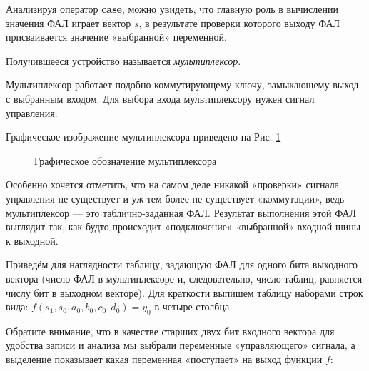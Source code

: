 \documentclass[a5paper, DIV=14, headings=openany, twoside=true,fontsize=10pt, titlepage]{scrreprt}
\newcommand{\quotes}[1]{«#1»}
\newcommand{\eng}[1]{\foreignlanguage{english}{#1}}
\newcommand{\kword}[1]{\eng{\textbf{#1}}}
\begin{document}
\par{Анализируя оператор \kword{case}, можно увидеть, что главную роль в вычислении значения ФАЛ играет вектор $s$, в результате проверки которого выходу ФАЛ присваивается значение \quotes{выбранной} переменной.}

\par{Получившееся устройство называется \emph{мультиплексор}}.

\par{Мультиплексор работает подобно коммутирующему ключу, замыкающему выход с выбранным входом. Для выбора входа мультиплексору нужен сигнал управления. }

\par{Графическое изображение мультиплексора приведено на Рис. \ref{fig:mux}}

\begin{figure}[H]
  \centering
  \def\svgwidth{\columnwidth}
  
  \caption{Графическое обозначение мультиплексора}
  \label{fig:mux}
\end{figure}

\par{Особенно хочется отметить, что на самом деле никакой \quotes{проверки} сигнала управления не существует и уж тем более не существует \quotes{коммутации}, ведь мультиплексор — это таблично-заданная ФАЛ. Результат выполнения этой ФАЛ выглядит так, как будто происходит \quotes{подключение} \quotes{выбранной} входной шины к выходной.}

\par{Приведём для наглядности таблицу, задающую ФАЛ для одного бита выходного вектора (число ФАЛ в мультиплексоре и, следовательно, число таблиц, равняется числу бит в выходном векторе). Для краткости выпишем таблицу наборами строк вида: $f(s_1, s_0, a_0, b_0, c_0, d_0) = y_0$ в четыре столбца.}

\par{Обратите внимание, что в качестве старших двух бит входного вектора для удобства записи и анализа мы выбрали переменные \quotes{управляющего} сигнала, а выделение показывает какая переменная \quotes{поступает} на выход функции $f$:}
\end{document}
